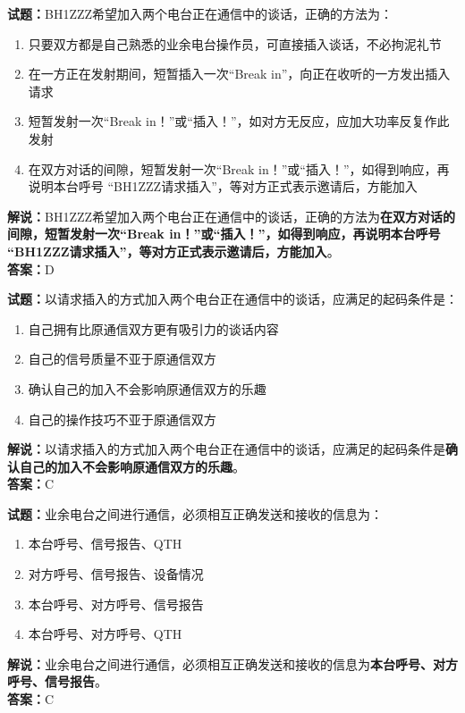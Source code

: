 \documentclass{ctexbook}
\begin{document}
\noindent\textbf{试题：}BH1ZZZ希望加入两个电台正在通信中的谈话，正确的方法为：
\begin{enumerate}[leftmargin=3em]
  \item 只要双方都是自己熟悉的业余电台操作员，可直接插入谈话，不必拘泥礼节
  \item 在一方正在发射期间，短暂插入一次“Break in”，向正在收听的一方发出插入请求
  \item 短暂发射一次“Break in！”或“插入！”，如对方无反应，应加大功率反复作此发射
  \item 在双方对话的间隙，短暂发射一次“Break in！”或“插入！”，如得到响应，再说明本台呼号 “BH1ZZZ请求插入”，等对方正式表示邀请后，方能加入
\end{enumerate}
\noindent\textbf{解说：}BH1ZZZ希望加入两个电台正在通信中的谈话，正确的方法为\textbf{在双方对话的间隙，短暂发射一次“Break in！”或“插入！”，如得到响应，再说明本台呼号 “BH1ZZZ请求插入”，等对方正式表示邀请后，方能加入}。\\\noindent\textbf{答案：}D

\vspace{\baselineskip}

\noindent\textbf{试题：}以请求插入的方式加入两个电台正在通信中的谈话，应满足的起码条件是：
\begin{enumerate}[leftmargin=3em]
  \item 自己拥有比原通信双方更有吸引力的谈话内容
  \item 自己的信号质量不亚于原通信双方
  \item 确认自己的加入不会影响原通信双方的乐趣
  \item 自己的操作技巧不亚于原通信双方
\end{enumerate}
\noindent\textbf{解说：}以请求插入的方式加入两个电台正在通信中的谈话，应满足的起码条件是\textbf{确认自己的加入不会影响原通信双方的乐趣}。\\\noindent\textbf{答案：}C

\vspace{\baselineskip}

\noindent\textbf{试题：}业余电台之间进行通信，必须相互正确发送和接收的信息为：
\begin{enumerate}[leftmargin=3em]
  \item 本台呼号、信号报告、QTH
  \item 对方呼号、信号报告、设备情况
  \item 本台呼号、对方呼号、信号报告
  \item 本台呼号、对方呼号、QTH
\end{enumerate}
\noindent\textbf{解说：}业余电台之间进行通信，必须相互正确发送和接收的信息为\textbf{本台呼号、对方呼号、信号报告}。\\\noindent\textbf{答案：}C
\end{document}
